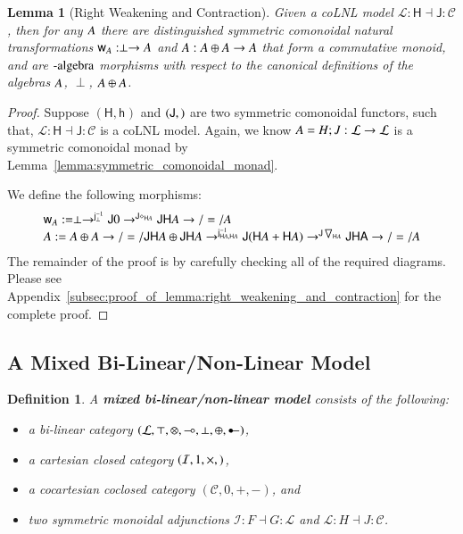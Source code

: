 \documentclass{lmcs}
\newtheorem{lemma}[theorem]{Lemma}
\newtheorem{definition}[theorem]{Definition}
\let\mto\to
\let\to\relax
\newcommand{\to}{\rightarrow}
\let\c\relax
\let\j\relax
\let\wn\relax
\newcommand{\cat}[1]{\mathcal{#1}}
\newcommand{\func}[1]{\mathsf{#1}}
\newcommand{\limp}[0]{\multimap}
\newcommand{\colimp}[0]{\multimapdotinv}
\newcommand{\h}[1]{\mathsf{h}_{#1}}
\newcommand{\w}[1]{\mathsf{w}_{#1}}
\newcommand{\c}[1]{\mathsf{c}_{#1}}
\newcommand{\j}[1]{\mathsf{j}_{#1}}
\newcommand{\jinv}[1]{\mathsf{j}^{-1}_{#1}}
\newcommand{\wn}[0]{\mathop{?}}
\newcommand{\codiag}[1]{\bigtriangledown_{#1}}
\begin{document}
\begin{lemma}[Right Weakening and Contraction]
  \label{lemma:right_weakening_and_contraction}
  Given a coLNL model $\cat{L} : \func{H} \dashv \func{J} : \cat{C}$,
  then for any $\wn A$ there are distinguished symmetric comonoidal
  natural transformations $\w{A} : \perp \mto \wn A$ and $\c{A} : \wn
  A \oplus \wn A \mto \wn A$ that form a commutative monoid, and are
  $\wn\text{-algebra}$ morphisms with respect to the canonical
  definitions of the algebras $\wn A$, $\perp$, $\wn A \oplus \wn A$.
\end{lemma}
\begin{proof}
  Suppose $(\func{H},\h{})$ and $(\func{J},\j{})$ are two symmetric
  comonoidal functors, such that, $\cat{L} : \func{H} \dashv \func{J}
  : \cat{C}$ is a coLNL model.  Again, we know $\wn A = H;J : \cat{L}
  \mto \cat{L}$ is a symmetric comonoidal monad by
  Lemma~\ref{lemma:symmetric_comonoidal_monad}.  
  
  We define the following morphisms:
  \[
  \begin{array}{lll}
    \w{A} := \perp \mto^{\jinv{\perp}} \func{J} 0 \mto^{\func{J}\diamond_{\func{H} A}} \func{JH}A \mto/=/ \wn A\\
    \c{A} := \wn A \oplus \wn A \mto/=/ \func{JH}A \oplus \func{JH}A \mto^{\jinv{\func{H}A,\func{H}A}} \func{J}(\func{H}A + \func{H}A) \mto^{\func{J}\codiag{\func{H}A}} \func{JHA} \mto/=/ \wn A
  \end{array}
  \]
  The remainder of the proof is by carefully checking all of the
  required diagrams.  Please see
  Appendix~\ref{subsec:proof_of_lemma:right_weakening_and_contraction}
  for the complete proof.
\end{proof}

\subsection{A Mixed Bi-Linear/Non-Linear Model}
\label{subsec:a_mixed_bi-linear_non-linear_model}
\begin{definition}
  \label{def:biLNL-model}
  A \textbf{mixed bi-linear/non-linear model} consists of the
  following:
  \begin{itemize}
  \item[i.] a bi-linear category $(\cat{L},
    \top,\otimes,\limp,\perp,\oplus,\colimp)$,
  \item[ii.] a cartesian closed category $(\cat{I},1,\times,\to)$,
  \item[iii.] a cocartesian coclosed category $(\cat{C},0,+,-)$, and
  \item[iv.] two symmetric monoidal adjunctions $\cat{I} : F \dashv G
    : \cat{L}$ and $\cat{L} : H \dashv J : \cat{C}$.
  \end{itemize}
\end{definition}
\end{document}
